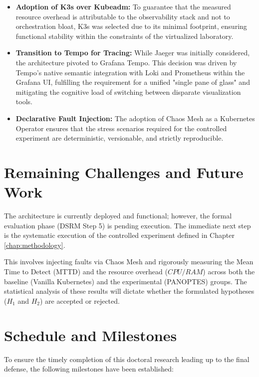 \begin{itemize}
    \item \textbf{Adoption of K3s over Kubeadm:} To guarantee that the measured resource overhead is attributable to the observability stack and not to orchestration bloat, K3s was selected due to its minimal footprint, ensuring functional stability within the constraints of the virtualized laboratory.
    \item \textbf{Transition to Tempo for Tracing:} While Jaeger was initially considered, the architecture pivoted to Grafana Tempo. This decision was driven by Tempo's native semantic integration with Loki and Prometheus within the Grafana UI, fulfilling the requirement for a unified "single pane of glass" and mitigating the cognitive load of switching between disparate visualization tools.
    \item \textbf{Declarative Fault Injection:} The adoption of Chaos Mesh as a Kubernetes Operator ensures that the stress scenarios required for the controlled experiment are deterministic, versionable, and strictly reproducible.
\end{itemize}

\section{Remaining Challenges and Future Work}

The architecture is currently deployed and functional; however, the formal evaluation phase (DSRM Step 5) is pending execution. The immediate next step is the systematic execution of the controlled experiment defined in Chapter \ref{chap:methodology}. 

This involves injecting faults via Chaos Mesh and rigorously measuring the Mean Time to Detect (MTTD) and the resource overhead ($CPU/RAM$) across both the baseline (Vanilla Kubernetes) and the experimental (PANOPTES) groups. The statistical analysis of these results will dictate whether the formulated hypotheses ($H_1$ and $H_2$) are accepted or rejected.

\section{Schedule and Milestones}

To ensure the timely completion of this doctoral research leading up to the final defense, the following milestones have been established:

